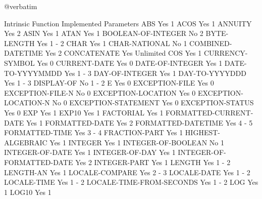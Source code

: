 @verbatim

Intrinsic Function              Implemented     Parameters
ABS                             Yes             1
ACOS                            Yes             1
ANNUITY                         Yes             2
ASIN                            Yes             1
ATAN                            Yes             1
BOOLEAN-OF-INTEGER              No              2
BYTE-LENGTH                     Yes             1 - 2
CHAR                            Yes             1
CHAR-NATIONAL                   No              1
COMBINED-DATETIME               Yes             2
CONCATENATE                     Yes             Unlimited
COS                             Yes             1
CURRENCY-SYMBOL                 Yes             0
CURRENT-DATE                    Yes             0
DATE-OF-INTEGER                 Yes             1
DATE-TO-YYYYMMDD                Yes             1 - 3
DAY-OF-INTEGER                  Yes             1
DAY-TO-YYYYDDD                  Yes             1 - 3
DISPLAY-OF                      No              1 - 2
E                               Yes             0
EXCEPTION-FILE                  Yes             0
EXCEPTION-FILE-N                No              0
EXCEPTION-LOCATION              Yes             0
EXCEPTION-LOCATION-N            No              0
EXCEPTION-STATEMENT             Yes             0
EXCEPTION-STATUS                Yes             0
EXP                             Yes             1
EXP10                           Yes             1
FACTORIAL                       Yes             1
FORMATTED-CURRENT-DATE          Yes             1
FORMATTED-DATE                  Yes             2
FORMATTED-DATETIME              Yes             4 - 5
FORMATTED-TIME                  Yes             3 - 4
FRACTION-PART                   Yes             1
HIGHEST-ALGEBRAIC               Yes             1
INTEGER                         Yes             1
INTEGER-OF-BOOLEAN              No              1
INTEGER-OF-DATE                 Yes             1
INTEGER-OF-DAY                  Yes             1
INTEGER-OF-FORMATTED-DATE       Yes             2
INTEGER-PART                    Yes             1
LENGTH                          Yes             1 - 2
LENGTH-AN                       Yes             1
LOCALE-COMPARE                  Yes             2 - 3
LOCALE-DATE                     Yes             1 - 2
LOCALE-TIME                     Yes             1 - 2
LOCALE-TIME-FROM-SECONDS        Yes             1 - 2
LOG                             Yes             1
LOG10                           Yes             1

